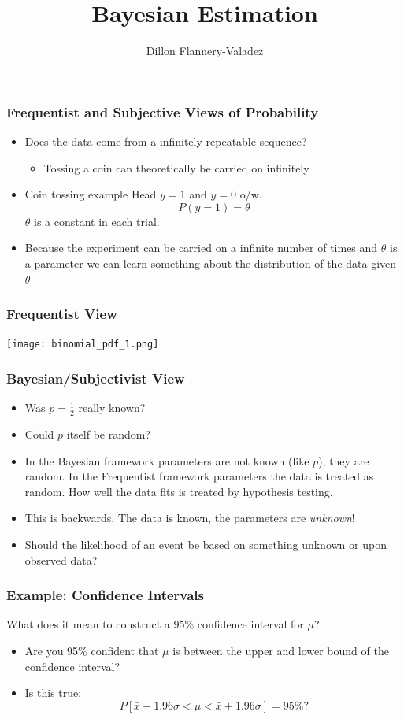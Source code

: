 \documentclass[table]{beamer}
\title{Bayesian Estimation}
\author{Dillon Flannery-Valadez}
\institute{Holland America Group Presentation}
\begin{document}
	
\titlepage


\begin{frame}
\frametitle{Frequentist and Subjective Views of Probability}
\begin{itemize}
	\item Does the data come from a infinitely repeatable sequence?
	\begin{itemize}
		\item Tossing a coin can theoretically be carried on infinitely
	\end{itemize}
	\item Coin tossing example Head $y = 1$ and $ y=0 $ o/w. 
	\[ P(y=1) = \theta \]
	$ \theta $ is a constant in each trial. 
	\item Because the experiment can be carried on a infinite number of times and $ \theta $ is a parameter we can learn something about the distribution of the data given $ \theta $
\end{itemize}
\end{frame}

\begin{frame}
	\frametitle{Frequentist View}
	\begin{center}
	\texttt{[image: binomial\_pdf\_1.png]}
	\end{center}
\end{frame}


\begin{frame}
	\frametitle{Bayesian/Subjectivist View}
	\begin{itemize}
		\item Was $ p = \frac{1}{2} $ really known?
		\item Could $ p $ itself be random?
		\item In the Bayesian framework parameters are not known (like $ p $), they are random. In the Frequentist framework parameters the data is treated as random. How well the data fits is treated by hypothesis testing. 
		\item This is backwards. The data is known, the parameters are \textit{unknown}!
		\item Should the likelihood of an event be based on something unknown or upon observed data?
	\end{itemize}
\end{frame}

\begin{frame}
	\frametitle{Example: Confidence Intervals}
	\begin{center}What does it mean to construct a 95\% confidence interval for $ \mu $?\end{center}
	\begin{itemize}
		\item Are you 95\% confident that $ \mu $ is between the upper and lower bound of the confidence interval?
		\item Is this true:
		\[ P[ \bar{x} - 1.96\sigma < \mu < \bar{x} + 1.96\sigma ] = 95\% ?\]
	\end{itemize}
\end{frame}
\end{document}
